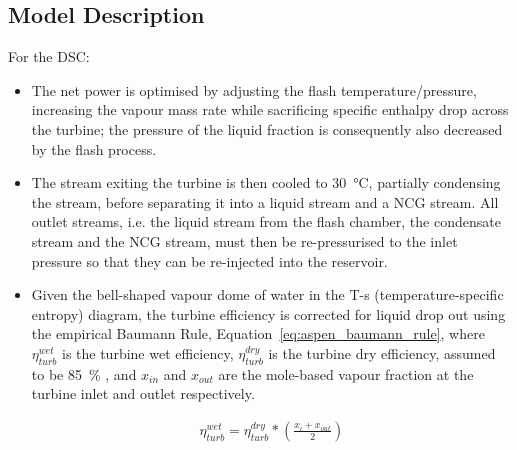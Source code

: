 \subsection{Model Description}
    For the \ac{DSC}:
    \begin{itemize}
        \item The net power is optimised by adjusting the flash temperature/pressure, increasing the vapour mass rate while sacrificing specific enthalpy drop across the turbine; the pressure of the liquid fraction is consequently also decreased by the flash process.
        \item The stream exiting the turbine is then cooled to \qty{30}{\degreeCelsius}, partially condensing the stream, before separating it into a liquid stream and a \ac{NCG} stream. All outlet streams, i.e. the liquid stream from the flash chamber, the condensate stream and the \ac{NCG} stream, must then be re-pressurised to the inlet pressure so that they can be re-injected into the reservoir.
        \item Given the bell-shaped vapour dome of water in the T-s (temperature-specific entropy) diagram, the turbine efficiency is corrected for liquid drop out using the empirical Baumann Rule, Equation~\ref{eq:aspen_baumann_rule}, where \(\eta_{turb}^{wet}\) is the turbine wet efficiency, \(\eta_{turb}^{dry}\) is the turbine dry efficiency, assumed to be \qty{85}{\percent} \cite{DiPippo2016}, and \(x_{in}\) and \(x_{out}\) are the mole-based vapour fraction at the turbine inlet and outlet respectively.

        \begin{align}
            \eta_{turb}^{wet} = \eta_{turb}^{dry}*\left(\frac{x_{i}+x_{out}}{2}\right) \label{eq:aspen_baumann_rule}
        \end{align}
    \end{itemize}
    
